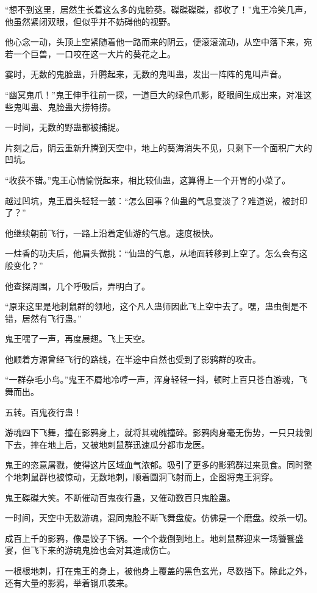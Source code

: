 \begin{this_body}
“想不到这里，居然生长着这么多的鬼脸葵。磔磔磔磔，都收了！”鬼王冷笑几声，他虽然紧闭双眼，但似乎并不妨碍他的视野。

他心念一动，头顶上空紧随着他一路而来的阴云，便滚滚流动，从空中落下来，宛若一个巨兽，一口咬在这一大片的葵花之上。

霎时，无数的鬼脸蛊，升腾起来，无数的鬼叫蛊，发出一阵阵的鬼叫声音。

“幽冥鬼爪！”鬼王伸手往前一探，一道巨大的绿色爪影，眨眼间生成出来，对准这些鬼叫蛊、鬼脸蛊大捞特捞。

一时间，无数的野蛊都被捕捉。

片刻之后，阴云重新升腾到天空中，地上的葵海消失不见，只剩下一个面积广大的凹坑。

“收获不错。”鬼王心情愉悦起来，相比较仙蛊，这算得上一个开胃的小菜了。

越过凹坑，鬼王眉头轻轻一皱：“怎么回事？仙蛊的气息变淡了？难道说，被封印了？”

他继续朝前飞行，一路上沿着定仙游的气息。速度极快。

一炷香的功夫后，他眉头微挑：“仙蛊的气息，从地面转移到上空了。怎么会有这般变化？”

他查探周围，几个呼吸后，弄明白了。

“原来这里是地刺鼠群的领地，这个凡人蛊师因此飞上空中去了。嘿，蛊虫倒是不错，居然有飞行蛊。”

鬼王嘿了一声，再度展翅。飞上天空。

他顺着方源曾经飞行的路线，在半途中自然也受到了影鸦群的攻击。

“一群杂毛小鸟。”鬼王不屑地冷哼一声，浑身轻轻一抖，顿时上百只苍白游魂，飞舞而出。

五转。百鬼夜行蛊！

游魂四下飞舞，撞在影鸦身上，就将其魂魄撞碎。影鸦肉身毫无伤势，一只只栽倒下去，摔在地上后，又被地刺鼠群迅速瓜分都市龙医。

鬼王的恣意屠戮，使得这片区域血气浓郁。吸引了更多的影鸦群过来觅食。同时整个地刺鼠群也被惊动，无数地刺，顺着圆洞飞射而上，企图将鬼王洞穿。

鬼王磔磔大笑。不断催动百鬼夜行蛊，又催动数百只鬼脸蛊。

一时间，天空中无数游魂，混同鬼脸不断飞舞盘旋。仿佛是一个磨盘。绞杀一切。

成百上千的影鸦，像是饺子下锅。一个个栽倒到地上。地刺鼠群迎来一场饕餮盛宴，但飞下来的游魂鬼脸也会对其造成伤亡。

一根根地刺，打在鬼王的身上，被他身上覆盖的黑色玄光，尽数挡下。除此之外，还有大量的影鸦，举着钢爪袭来。


\end{this_body}
